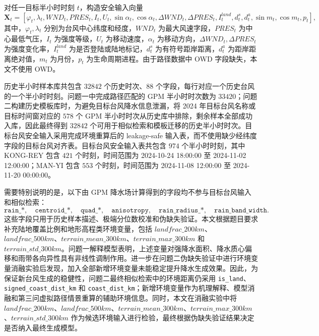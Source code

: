 \documentclass[UTF8,a4paper,zihao=5,fontset=fandol]{ctexart}
\numberwithin{equation}{section}
\numberwithin{figure}{section}
\numberwithin{table}{section}
\begin{document}
对任一目标半小时时刻 $t$，构造安全输入向量
\begin{equation}
\boldsymbol{X}_t=
\left[
\varphi_t,\lambda_t,WND_t,PRES_t,I_t,U_t,
\sin \alpha_t,\cos \alpha_t,
\Delta WND_t,\Delta PRES_t,
I_t^{land},d_t^s,d_t^a,
\sin m_t,\cos m_t,p_t
\right],
\end{equation}
其中，$\varphi_t,\lambda_t$ 分别为台风中心纬度和经度，$WND_t$ 为最大风速字段，$PRES_t$ 为中心最低气压，$I_t$ 为强度等级，$U_t$ 为移动速度，$\alpha_t$ 为移动方向，$\Delta WND_t,\Delta PRES_t$ 为强度变化率，$I_t^{land}$ 为是否登陆或陆地标记，$d_t^s$ 为有符号距岸距离，$d_t^a$ 为距岸距离绝对值，$m_t$ 为月份，$p_t$ 为生命周期进程。由于路径数据中 OWD 字段缺失，本文不使用 OWD。

历史半小时样本库共包含 $32842$ 个历史时次、$88$ 个字段，每行对应一个历史台风的一个半小时时刻。问题一中完成路径匹配的 GPM 半小时时次数为 $33420$；问题二构建历史模板库时，为避免目标台风降水信息泄漏，将 2024 年目标台风名称或目标时间窗对应的 $578$ 个 GPM 半小时时次从历史库中排除，剩余样本全部成功入库，因此最终得到 $32842$ 个可用于相似检索和模板迁移的历史半小时时次。目标台风安全输入采用完成环境重算后的 leakage-safe 输入表，而不使用缺少经纬度字段的目标台风对齐表。目标台风安全输入表共包含 $974$ 个半小时时刻，其中 KONG-REY 包含 $421$ 个时刻，时间范围为 2024-10-24 18:00:00 至 2024-11-02 12:00:00；MAN-YI 包含 $553$ 个时刻，时间范围为 2024-11-08 12:00:00 至 2024-11-20 00:00:00。

需要特别说明的是，以下由 GPM 降水场计算得到的字段均不参与目标台风输入和相似检索：
\begin{equation}
\texttt{rain\_*},\quad
\texttt{centroid\_*},\quad
\texttt{quad\_*},\quad
\texttt{anisotropy},\quad
\texttt{rain\_radius\_*},\quad
\texttt{rain\_band\_width}.
\end{equation}
这些字段只用于历史样本描述、极端分位数校准和伪缺失验证。本文根据题目要求补充陆地覆盖比例和地形高程类环境变量，包括 $landfrac\_200km$、$landfrac\_500km$、$terrain\_mean\_300km$、$terrain\_max\_300km$ 和 $terrain\_std\_300km$。问题一解释模型表明，上述变量对强降水面积、降水质心偏移和雨带各向异性具有非线性调制作用。进一步在问题二伪缺失验证中进行环境变量消融实验后发现，加入全部新增环境变量未能稳定提升降水生成效果。因此，为保证新台风生成的稳健性，问题二最终相似检索中的环境距离仍采用 \texttt{is\_land}、\texttt{signed\_coast\_dist\_km} 和 \texttt{coast\_dist\_km}；新增环境变量作为机理解释、模型消融和第三问虚拟路径情景重算的辅助环境信息。同时，本文在消融实验中将 $landfrac\_200km$、$landfrac\_500km$、$terrain\_mean\_300km$、$terrain\_max\_300km$、$terrain\_std\_300km$ 作为候选环境输入进行检验，最终根据伪缺失验证结果决定是否纳入最终生成模型。
\end{document}
